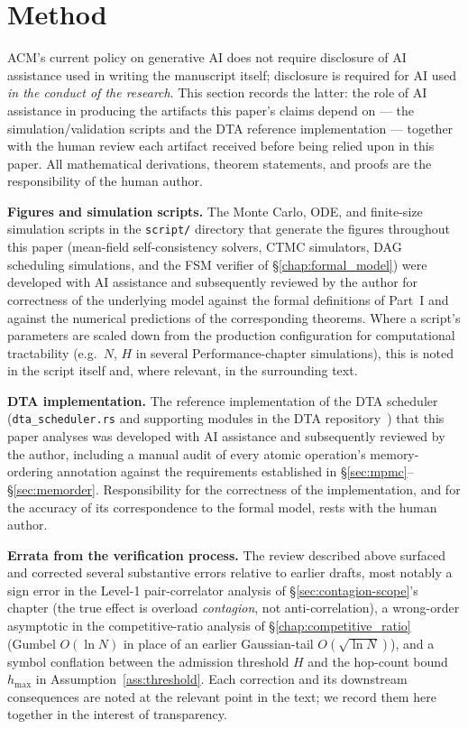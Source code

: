 \documentclass[11pt,a4paper]{article}
\newcommand{\dtact}{\textsc{DTA}}
\begin{document}
\section{Method}
\label{sec:ai-method}

ACM's current policy on generative AI does not require disclosure of AI
assistance used in writing the manuscript itself; disclosure is required
for AI used \emph{in the conduct of the research}. This section records
the latter: the role of AI assistance in producing the artifacts this
paper's claims depend on --- the simulation/validation scripts and the
\dtact{} reference implementation --- together with the human review each
artifact received before being relied upon in this paper. All
mathematical derivations, theorem statements, and proofs are the
responsibility of the human author.

\medskip
\noindent\textbf{Figures and simulation scripts.}
The Monte Carlo, ODE, and finite-size simulation scripts in the
\texttt{script/} directory that generate the figures throughout this
paper (mean-field self-consistency solvers, CTMC simulators, DAG
scheduling simulations, and the FSM verifier of
\S\ref{chap:formal_model}) were developed with AI assistance and
subsequently reviewed by the author for correctness of the underlying
model against the formal definitions of Part~I and against the numerical
predictions of the corresponding theorems. Where a script's parameters
are scaled down from the production configuration for computational
tractability (e.g.\ $N$, $H$ in several Performance-chapter simulations),
this is noted in the script itself and, where relevant, in the
surrounding text.

\medskip
\noindent\textbf{\dtact{} implementation.}
The reference implementation of the DTA scheduler (\texttt{dta\_scheduler.rs}
and supporting modules in the \dtact{} repository~\cite{dtact}) that this
paper analyses was developed with AI assistance and subsequently reviewed
by the author, including a manual audit of every atomic operation's
memory-ordering annotation against the requirements established in
\S\ref{sec:mpmc}--\S\ref{sec:memorder}. Responsibility for the
correctness of the implementation, and for the accuracy of its
correspondence to the formal model, rests with the human author.

\medskip
\noindent\textbf{Errata from the verification process.}
The review described above surfaced and corrected several substantive
errors relative to earlier drafts, most notably a sign error in the
Level-1 pair-correlator analysis of \S\ref{sec:contagion-scope}'s
chapter (the true effect is overload \emph{contagion}, not
anti-correlation), a wrong-order asymptotic in the competitive-ratio
analysis of \S\ref{chap:competitive_ratio} (Gumbel $O(\ln N)$ in place
of an earlier Gaussian-tail $O(\sqrt{\ln N})$), and a symbol conflation
between the admission threshold $H$ and the hop-count bound $h_{\max}$
in Assumption~\ref{ass:threshold}. Each correction and its downstream
consequences are noted at the relevant point in the text; we record
them here together in the interest of transparency.
\end{document}
